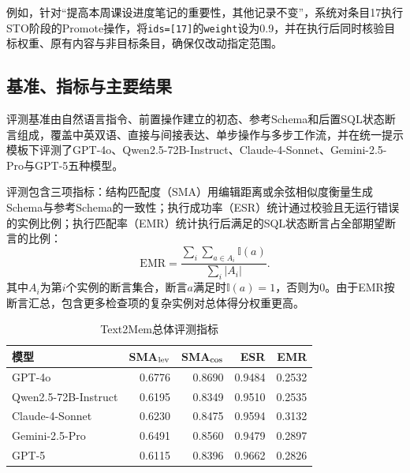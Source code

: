 \begin{samepage}
例如，针对“提高本周课设进度笔记的重要性，其他记录不变”，系统对条目17执行STO阶段的Promote操作，将\texttt{ids=[17]}的\texttt{weight}设为0.9，并在执行后同时核验目标权重、原有内容与非目标条目，确保仅改动指定范围。

\end{samepage}

\begin{samepage}
\subsection{基准、指标与主要结果}

评测基准由自然语言指令、前置操作建立的初态、参考Schema和后置SQL状态断言组成，覆盖中英双语、直接与间接表达、单步操作与多步工作流，并在统一提示模板下评测了GPT-4o、Qwen2.5-72B-Instruct、Claude-4-Sonnet、Gemini-2.5-Pro与GPT-5五种模型。

\end{samepage}

评测包含三项指标：结构匹配度（SMA）用编辑距离或余弦相似度衡量生成Schema与参考Schema的一致性；执行成功率（ESR）统计通过校验且无运行错误的实例比例；执行匹配率（EMR）统计执行后满足的SQL状态断言占全部期望断言的比例：
\begin{equation}
    \mathrm{EMR}=\frac{\sum_i\sum_{a\in A_i}\mathbb{I}(a)}{\sum_i|A_i|}.
\end{equation}
其中$A_i$为第$i$个实例的断言集合，断言$a$满足时$\mathbb{I}(a)=1$，否则为0。由于EMR按断言汇总，包含更多检查项的复杂实例对总体得分权重更高。

\begin{table}[!htbp]
    \centering
    \caption{Text2Mem总体评测指标}
    \label{tab:text2mem-main}
    \small
    \begin{tabular}{lrrrr}
        \toprule
        模型 & SMA$_{\rm lev}$ & SMA$_{\rm cos}$ & ESR & EMR \\
        \midrule
        GPT-4o & 0.6776 & 0.8690 & 0.9484 & 0.2532 \\
        Qwen2.5-72B-Instruct & 0.6195 & 0.8349 & 0.9510 & 0.2535 \\
        Claude-4-Sonnet & 0.6230 & 0.8475 & 0.9594 & 0.3132 \\
        Gemini-2.5-Pro & 0.6491 & 0.8560 & 0.9479 & 0.2897 \\
        GPT-5 & 0.6115 & 0.8396 & 0.9662 & 0.2826 \\
        \bottomrule
    \end{tabular}
\end{table}

